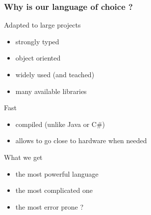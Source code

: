 \begin{frame}
  \frametitle{Why is \cpp our language of choice ?}
  \begin{block}{Adapted to large projects}
    \begin{itemize}
    \item strongly typed
    \item object oriented
    \item widely used (and teached)
    \item many available libraries
    \end{itemize}
  \end{block}
  \pause
  \begin{block}{Fast}
    \begin{itemize}
    \item compiled (unlike Java or C\#)
    \item allows to go close to hardware when needed
    \end{itemize}
  \end{block}
  \pause
  \begin{alertblock}{What we get}
    \begin{itemize}
    \item the most powerful language
    \item the most complicated one
    \item the most error prone ?
    \end{itemize}
  \end{alertblock}
\end{frame}
